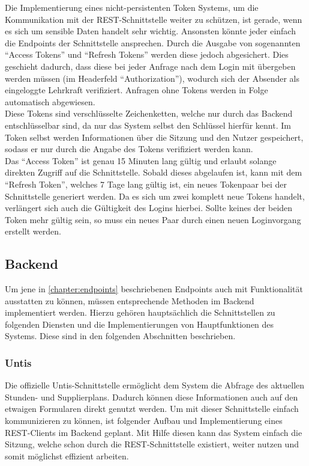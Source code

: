 Die Implementierung eines nicht-persistenten Token Systems, um die Kommunikation mit der REST-Schnittstelle weiter zu schützen, ist gerade, wenn es sich um sensible Daten handelt sehr wichtig. Ansonsten könnte jeder einfach die Endpoints der Schnittstelle ansprechen. Durch die Ausgabe von sogenannten \enquote{Access Tokens} und \enquote{Refresh Tokens} werden diese jedoch abgesichert. Dies geschieht dadurch, dass diese bei jeder Anfrage nach dem Login mit übergeben werden müssen (im Headerfeld \enquote{Authorization}), wodurch sich der Absender als eingeloggte Lehrkraft verifiziert. Anfragen ohne Tokens werden in Folge automatisch abgewiesen. 
\\Diese Tokens sind verschlüsselte Zeichenketten, welche nur durch das Backend entschlüsselbar sind, da nur das System selbst den Schlüssel hierfür kennt. Im Token selbst werden Informationen über die Sitzung und den Nutzer gespeichert, sodass er nur durch die Angabe des Tokens verifiziert werden kann.\\
Das \enquote{Access Token} ist genau 15 Minuten lang gültig und erlaubt solange direkten Zugriff auf die Schnittstelle. Sobald dieses abgelaufen ist, kann mit dem \enquote{Refresh Token}, welches 7 Tage lang gültig ist, ein neues Tokenpaar bei der Schnittstelle generiert werden. Da es sich um zwei komplett neue Tokens handelt, verlängert sich auch die Gültigkeit des Logins hierbei. Sollte keines der beiden Token mehr gültig sein, so muss ein neues Paar durch einen neuen Loginvorgang erstellt werden.

\subsection{Backend}
Um jene in  \autoref{chapter:endpoints} beschriebenen Endpoints auch mit Funktionalität ausstatten zu können, müssen entsprechende Methoden im Backend implementiert werden. Hierzu gehören hauptsächlich die Schnittstellen zu folgenden Diensten und die Implementierungen von Hauptfunktionen des Systems. Diese sind in den folgenden Abschnitten beschrieben.

\subsubsection{Untis}

Die offizielle Untis-Schnittstelle ermöglicht dem System die Abfrage des aktuellen Stunden- und Supplierplans. Dadurch können diese Informationen auch auf den etwaigen Formularen direkt genutzt werden. Um mit dieser Schnittstelle einfach kommunizieren zu können, ist folgender Aufbau und Implementierung eines REST-Clients im Backend geplant. Mit Hilfe diesen kann das System einfach die Sitzung, welche schon durch die REST-Schnittstelle existiert, weiter nutzen und somit möglichst effizient arbeiten.


